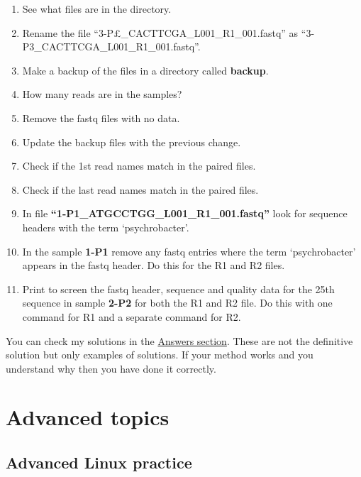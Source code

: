 \documentclass[
  letterpaper,
  DIV=11,
  numbers=noendperiod]{scrreprt}
\providecommand{\tightlist}{%
  \setlength{\itemsep}{0pt}\setlength{\parskip}{0pt}}\usepackage{longtable,booktabs,array}
\begin{document}
\begin{enumerate}
\def\labelenumi{\arabic{enumi}.}
\tightlist
\item
  See what files are in the directory.\\
\item
  Rename the file ``3-P£\_CACTTCGA\_L001\_R1\_001.fastq'' as
  ``3-P3\_CACTTCGA\_L001\_R1\_001.fastq''.\\
\item
  Make a backup of the files in a directory called \textbf{backup}.\\
\item
  How many reads are in the samples?\\
\item
  Remove the fastq files with no data.
\item
  Update the backup files with the previous change.\\
\item
  Check if the 1st read names match in the paired files.\\
\item
  Check if the last read names match in the paired files.\\
\item
  In file \textbf{``1-P1\_ATGCCTGG\_L001\_R1\_001.fastq''} look for
  sequence headers with the term `psychrobacter'.\\
\item
  In the sample \textbf{1-P1} remove any fastq entries where the term
  `psychrobacter' appears in the fastq header. Do this for the R1 and R2
  files.\\
\item
  Print to screen the fastq header, sequence and quality data for the
  25th sequence in sample \textbf{2-P2} for both the R1 and R2 file. Do
  this with one command for R1 and a separate command for R2.
\end{enumerate}

You can check my solutions in the
\protect\hyperlink{exercise2_answers}{Answers section}. These are not
the definitive solution but only examples of solutions. If your method
works and you understand why then you have done it correctly.

\part{Advanced topics}

\hypertarget{advancedlinux}{%
\chapter{Advanced Linux practice}\label{advancedlinux}}
\end{document}
